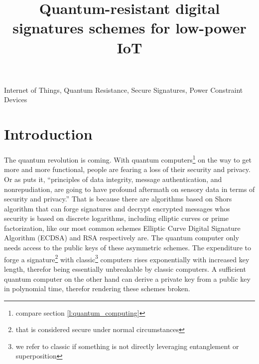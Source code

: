 \documentclass[conference]{IEEEtran}
\newcommand{\comment}[1]{}
\begin{document}
\title{Quantum-resistant digital signatures schemes for low-power IoT}

\author{
}

\maketitle

\begin{abstract}
\end{abstract}

\begin{IEEEkeywords}
Internet of Things, Quantum Resistance, Secure Signatures, Power Constraint Devices
\end{IEEEkeywords}


\section{Introduction}
\comment{ %
    „principles of data integrity, message authentication, and nonrepudiation, are going to have profound aftermath on sensory data in terms of security and privacy.“ \cite{QR_sigs}
} %

The quantum revolution is coming. With quantum computers\footnote{compare section \ref{l:quantum_computing}} on the way to get more and more functional, people are fearing a loss of their security and privacy.
Or as \cite{QR_sigs} puts it, ``principles of data integrity, message authentication, and nonrepudiation, are going to have profound aftermath on sensory data in terms of security and privacy.''
That is because there are algorithms based on Shors algorithm that can forge signatures and decrypt encrypted messages whos security is based on discrete logarithms, including elliptic curves or prime factorization, like our most common schemes Elliptic Curve Digital Signature Algorithm (ECDSA) and RSA respectively are.
The quantum computer only needs access to the public keys of these asymmetric schemes.
The expenditure to forge a signature\footnote{that is considered secure under normal circumstances 
} with classic\footnote{we refer to classic if something is not directly leveraging entanglement or superposition} computers rises exponentially with increased key length, therefor being essentially unbreakable by classic computers.
A sufficient quantum computer on the other hand can derive a private key from a public key in polynomial time, therefor rendering these schemes broken.
\end{document}
